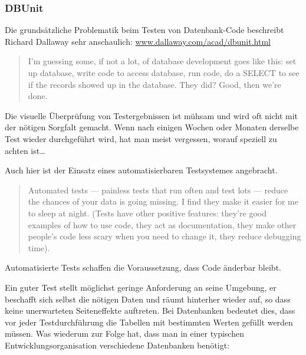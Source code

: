 \subsubsection{DBUnit}
Die grundsätzliche Problematik beim Testen von Datenbank-Code
beschreibt Richard Dallaway sehr anschaulich:
\href{http://www.dallaway.com/acad/dbunit.html}
{www.dallaway.com/acad/dbunit.html}
\begin{quote}
I'm guessing some, if not a lot, of database development goes like
this: set up database, write code to access database, run code, do a
SELECT to see if the records showed up in the database. They did?
Good, then we're done.
\end{quote}
Die visuelle Überprüfung von Testergebnissen ist mühsam und wird oft
nicht mit der nötigen Sorgfalt gemacht. Wenn nach einigen Wochen oder
Monaten derselbe Test wieder durchgeführt wird, hat man meist
vergessen, worauf speziell zu achten ist\ldots

\newslide
Auch hier ist der
Einsatz eines automatisierbaren Testsystemes
angebracht.

\begin{quote}
Automated tests — painless tests that run often and test lots — reduce
the chances of your data is going missing. I find they make it easier
for me to sleep at night. (Tests have other positive features: they're
good examples of how to use code, they act as documentation, they make
other people's code less scary when you need to change it, they reduce
debugging time).
\end{quote}

Automatisierte Tests schaffen die Voraussetzung, dass Code
änderbar bleibt.

\newslide
Ein guter Test stellt möglichst geringe Anforderung an seine Umgebung,
er beschafft sich selbst die nötigen Daten und räumt hinterher wieder
auf, so dass keine unerwarteten Seiteneffekte auftreten. Bei
Datenbanken bedeutet dies, dass vor jeder Testdurchführung die Tabellen mit
bestimmten Werten gefüllt werden müssen. Was wiederum zur Folge hat,
dass man in einer typischen Entwicklungsorganisation verschiedene
Datenbanken benötigt:

